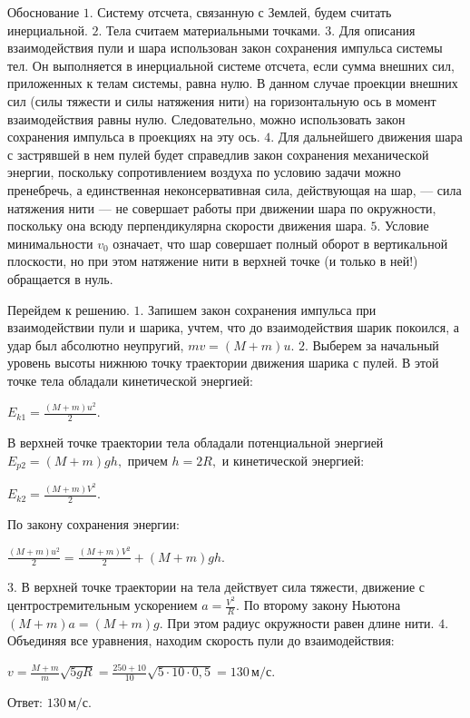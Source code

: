 \documentclass[12pt,a4paper]{article}
\begin{document}
{Обоснование
$1$. Систему отсчета, связанную с Землей, будем считать инерциальной.
$2$. Тела считаем материальными точками.
$3$. Для описания взаимодействия пули и шара использован закон сохранения импульса системы тел. Он выполняется в инерциальной системе отсчета, если сумма внешних сил, приложенных к телам системы, равна нулю. В данном случае проекции внешних сил (силы тяжести и силы натяжения нити) на горизонтальную ось в момент взаимодействия равны нулю. Следовательно, можно использовать закон сохранения импульса в проекциях на эту ось.
$4$. Для дальнейшего движения шара с застрявшей в нем пулей будет справедлив закон сохранения механической энергии, поскольку сопротивлением воздуха по условию задачи можно пренебречь, а единственная неконсервативная сила, действующая на шар, — сила натяжения нити — не совершает работы при движении шара по окружности, поскольку она всюду перпендикулярна скорости движения шара.
$5$. Условие минимальности $v_0$ означает, что шар совершает полный оборот в вертикальной плоскости, но при этом натяжение нити в верхней точке (и только в ней!) обращается в нуль.
\begin{center}\end{center}


Перейдем к решению.
$1$. Запишем закон сохранения импульса при взаимодействии пули и шарика, учтем, что до взаимодействия шарик покоился, а удар был абсолютно неупругий, $mv=(M+m)u.$ 
$2$. Выберем за начальный уровень высоты нижнюю точку траектории движения шарика с пулей. В этой точке тела обладали кинетической энергией:

$E_{k1}=\frac{(M+m)u^2}2.$

В верхней точке траектории тела обладали потенциальной энергией $E_{p2}=(M+m)gh,$ причем $h=2R,$ и кинетической энергией:

$E_{k2}=\frac{(M+m)V^2}2.$

По закону сохранения энергии:

$\frac{(M+m)u^2}2=\frac{(M+m)V^2}2+(M+m)gh.$ 

$3$. В верхней точке траектории на тела действует сила тяжести, движение с центростремительным ускорением $a=\frac{V^2}R.$ По второму закону Ньютона $(M+m)a=(M+m)g.$ При этом радиус окружности равен длине нити. 
$4$. Объединяя все уравнения, находим скорость пули до взаимодействия:

$v=\frac{M+m}{m}\sqrt{5gR}=\frac{250+10}{10}\sqrt{5\cdot10\cdot0{,}5}=130\,\text{м/с}.$

Ответ: $130\,\text{м/с}$.
}
\end{document}
